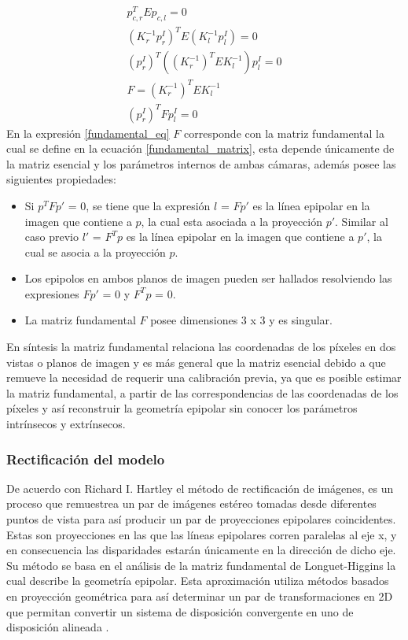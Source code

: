 \begin{align}
    p_{c,r}^{T} E p_{c,l} = 0\\
    (K^{-1}_{r}p^{I}_{r})^{T}E(K^{-1}_{l}p^{I}_{l}) = 0\\
    (p^{I}_{r})^{T}((K^{-1}_{r})^{T}EK^{-1}_{l})p^{I}_{l} = 0\\
    F = (K^{-1}_{r})^{T}EK^{-1}_{l} \label{fundamental_matrix} \\
    (p^{I}_{r})^{T}Fp^{I}_{l} = 0 \label{fundamental_eq}
\end{align}
En la expresión \eqref{fundamental_eq} $F$ corresponde con la matriz fundamental la cual se define en la ecuación \eqref{fundamental_matrix}, esta depende únicamente de la matriz esencial y los parámetros internos de ambas cámaras, además posee las siguientes propiedades:
\begin{itemize}
    \item Si $p^{T}Fp'$ = 0, se tiene que la expresión $l$ = $Fp'$ es la línea epipolar en la imagen que contiene a $p$, la cual esta asociada a la proyección $p'$. Similar al caso previo $l'$ = $F^{T}p$ es la línea epipolar en la imagen que contiene a $p'$, la cual se asocia a la proyección $p$.
    \item Los epipolos en ambos planos de imagen pueden ser hallados resolviendo las expresiones $Fp'$ = 0 y $F^{T}p$ = 0.
    \item La matriz fundamental $F$ posee dimensiones 3 x 3 y es singular.
\end{itemize}
En síntesis la matriz fundamental \cite[p~241]{Hartley2004} relaciona las coordenadas de los píxeles en dos vistas o planos de imagen y es más general que la matriz esencial debido a que remueve la necesidad de requerir una calibración previa, ya que es posible estimar la matriz fundamental, a partir de las correspondencias de las coordenadas de los píxeles y así reconstruir la geometría epipolar sin conocer los parámetros intrínsecos y extrínsecos.
\subsubsection{Rectificación del modelo} \label{rectification_section}
De acuerdo con Richard I. Hartley el método de rectificación de imágenes, es un proceso que remuestrea un par de imágenes estéreo tomadas desde diferentes puntos de vista para así producir un par de proyecciones epipolares coincidentes. Estas son
proyecciones en las que las líneas epipolares corren paralelas al eje x, y en consecuencia las disparidades estarán únicamente en la dirección de dicho eje. Su método se basa en el análisis de la matriz fundamental de Longuet-Higgins la cual describe la geometría epipolar. Esta aproximación utiliza métodos basados en proyección geométrica para así determinar un par de transformaciones en 2D que permitan convertir un sistema de disposición convergente en uno de disposición alineada \cite{Hartley1999}.
